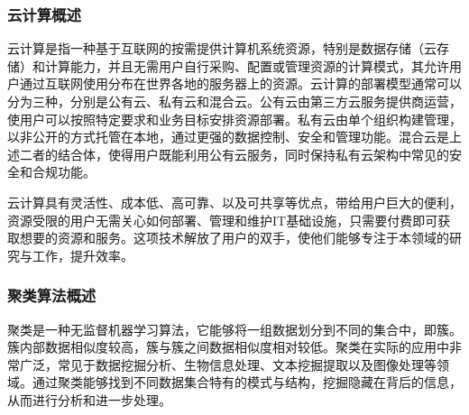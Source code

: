 \subsubsection{云计算概述}
云计算是指一种基于互联网的按需提供计算机系统资源，特别是数据存储（云存储）和计算能力，并且无需用户自行采购、配置或管理资源的计算模式\cite{montazerolghaem2020green}，其允许用户通过互联网使用分布在世界各地的服务器上的资源。云计算的部署模型通常可以分为三种，分别是公有云、私有云和混合云。公有云由第三方云服务提供商运营，使用户可以按照特定要求和业务目标安排资源部署。私有云由单个组织构建管理，以非公开的方式托管在本地，通过更强的数据控制、安全和管理功能。混合云是上述二者的结合体，使得用户既能利用公有云服务，同时保持私有云架构中常见的安全和合规功能。

云计算具有灵活性、成本低、高可靠、以及可共享等优点，带给用户巨大的便利，资源受限的用户无需关心如何部署、管理和维护IT基础设施，只需要付费即可获取想要的资源和服务。这项技术解放了用户的双手，使他们能够专注于本领域的研究与工作，提升效率。

\subsubsection{聚类算法概述}
聚类是一种无监督机器学习算法，它能够将一组数据划分到不同的集合中，即簇。簇内部数据相似度较高，簇与簇之间数据相似度相对较低。聚类在实际的应用中非常广泛，常见于数据挖掘分析、生物信息处理、文本挖掘提取以及图像处理等领域。通过聚类能够找到不同数据集合特有的模式与结构，挖掘隐藏在背后的信息，从而进行分析和进一步处理。

